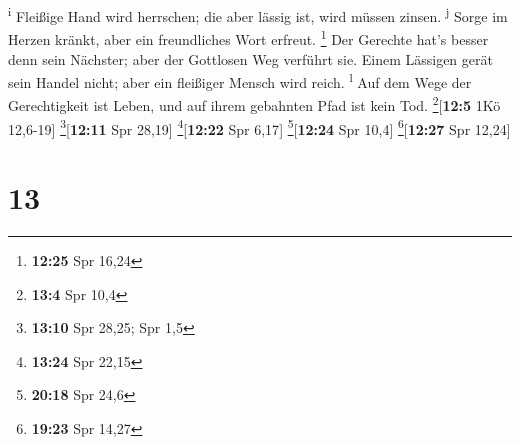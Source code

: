 \textsuperscript{i}  Fleißige Hand wird herrschen; die
aber lässig ist, wird müssen zinsen. \textsuperscript{j} 
Sorge im Herzen kränkt, aber ein freundliches Wort erfreut. \footnote{\textbf{12:25}
  Spr 16,24}  Der Gerechte hat's besser denn sein
Nächster; aber der Gottlosen Weg verführt sie.  Einem
Lässigen gerät sein Handel nicht; aber ein fleißiger Mensch wird reich.
\textsuperscript{l}  Auf dem Wege der Gerechtigkeit ist
Leben, und auf ihrem gebahnten Pfad ist kein Tod.
\footnote{\textbf{13:4} Spr 10,4}{[}\textbf{12:5} 1Kö 12,6-19{]}
\footnote{\textbf{13:10} Spr 28,25; Spr 1,5}{[}\textbf{12:11} Spr
28,19{]} \footnote{\textbf{13:24} Spr 22,15}{[}\textbf{12:22} Spr
6,17{]} \footnote{\textbf{20:18} Spr 24,6}{[}\textbf{12:24} Spr 10,4{]}
\footnote{\textbf{19:23} Spr 14,27}{[}\textbf{12:27} Spr 12,24{]}

\hypertarget{section-12}{%
\section{13}\label{section-12}}

